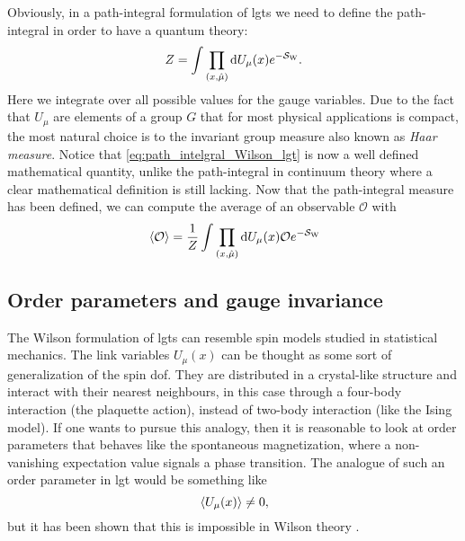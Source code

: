 Obviously, in a path-integral formulation of \ac{lgt}s we need to define the path-integral in order to have a quantum theory:
\begin{equation}
    Z = \int \prod_{(x, \hat{\mu})}  \dd U_{\mu}(x) e^{- \mathcal{S}_{\text{W}}}.
    \label{eq:path_intelgral_Wilson_lgt}
\end{equation}
Here we integrate over all possible values for the gauge variables.
Due to the fact that $U_{\mu}$ are elements of a group $G$ that for most physical applications is compact, the most natural choice is to the invariant group measure also known as \emph{Haar measure}.
Notice that \eqref{eq:path_intelgral_Wilson_lgt} is now a well defined mathematical quantity, unlike the path-integral in continuum theory where a clear mathematical definition is still lacking.
Now that the path-integral measure has been defined, we can compute the average of an observable $\mathcal{O}$ with
\begin{equation}
    \ev*{\mathcal{O}} = \frac{1}{Z} \int \prod_{(x, \hat{\mu})} \dd U_{\mu}(x) \mathcal{O} e^{- \Action_{\text{W}}}
\end{equation}


%
%
\subsection{Order parameters and gauge invariance}
\label{sub:wilson_confinement_test}

The Wilson formulation of \ac{lgt}s can resemble spin models studied in statistical mechanics.
The link variables $U_{\mu}(x)$ can be thought as some sort of generalization of the spin \ac{dof}.
They are distributed in a crystal-like structure and interact with their nearest neighbours, in this case through a four-body interaction (the plaquette action), instead of two-body interaction (like the Ising model).
If one wants to pursue this analogy, then it is reasonable to look at order parameters that behaves like the spontaneous magnetization, where a non-vanishing expectation value signals a phase transition.
The analogue of such an order parameter in \ac{lgt} would be something like
\begin{equation}
    \ev*{U_{\mu}(x)} \neq 0,
    \label{eq:non_zero_link_var_expt_value}
\end{equation}
but it has been shown that this is impossible in Wilson theory \cite{elitzur1975theorem}.

